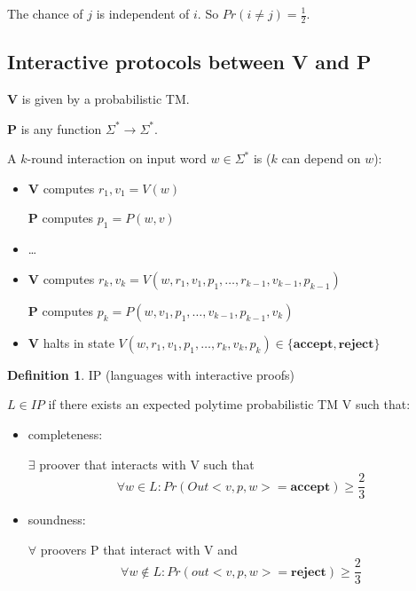 \documentclass[a4paper,12pt]{article}
\theoremstyle{definition}
\newtheorem{definition}[counter]{Definition}
\theoremstyle{remark}
\begin{document}
The chance of $j$ is independent of $i$. So $Pr(i \neq j) = \frac{1}{2}$.

\subsection{Interactive protocols between \textbf{V} and \textbf{P}}
\textbf{V} is given by a probabilistic TM.

\textbf{P} is any function $\Sigma^* \to \Sigma^*$.

A $k$-round interaction on input word $w \in \Sigma^*$ is ($k$ can depend on $w$):

\begin{itemize}
    \item \textbf{V} computes $r_1, v_1 = V(w)$
    
    \textbf{P} computes $p_1 = P(w, v)$

    \item \dots
    
    \item \textbf{V} computes $r_k, v_k = V(w, r_1, v_1, p_1, \dots, r_{k-1}, v_{k-1}, p_{k-1})$
    
    \textbf{P} computes $p_k = P(w, v_1, p_1, \dots, v_{k-1}, p_{k-1}, v_k)$

    \item \textbf{V} halts in state $V(w, r_1, v_1, p_1, \dots, r_k, v_k, p_k) \in \{\textbf{accept}, \textbf{reject}\}$
\end{itemize}

\begin{definition}
    IP (languages with interactive proofs)

    $L \in IP $ if there exists an expected polytime probabilistic TM V such that:
    \begin{itemize}
        \item completeness:
        
        $\exists$ proover that interacts with V such that
        \begin{equation*}
            \forall w \in L: Pr(Out<v,p,w>=\textbf{accept}) \geq \frac{2}{3}
        \end{equation*}
        \item soundness:
        
        $\forall$ proovers P that interact with V and
        \begin{equation*}
            \forall w \notin L: Pr(out<v,p,w>=\textbf{reject}) \geq \frac{2}{3}
        \end{equation*}
    \end{itemize}

\end{definition}
\end{document}
